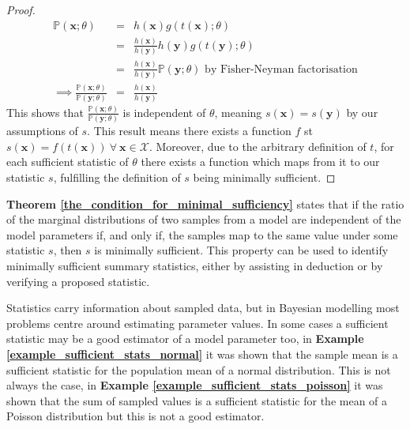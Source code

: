 \documentclass[bibliography=totoc,11pt,a4paper,margin=0]{article}
\newcommand*{\prob}{\mathbb{P}}
\theoremstyle{break}
\begin{document}
\begin{box_theorem}
\begin{proof}
      \[\begin{array}{rcl}
        \prob(\mathbf{x};\theta)&=&h(\mathbf{x})g(t(\mathbf{x});\theta)\\
        &=&\frac{h(\mathbf{x})}{h(\mathbf{y})}h(\mathbf{y})g(t(\mathbf{y});\theta)\\
        &=&\frac{h(\mathbf{x})}{h(\mathbf{y})}\prob(\mathbf{y};\theta)\text{ by Fisher-Neyman factorisation}\\
        \implies\frac{\prob(\mathbf{x};\theta)}{\prob(\mathbf{y};\theta)}&=&\frac{h(\mathbf{x})}{h(\mathbf{y})}
      \end{array}\]
      This shows that $\frac{\prob(\mathbf{x};\theta)}{\prob(\mathbf{y};\theta)}$ is independent of $\theta$, meaning $s(\mathbf{x})=s(\mathbf{y})$ by our assumptions of $s$. This result means there exists a function $f$ st $s(\mathbf{x})=f(t(\mathbf{x}))\ \forall\ \mathbf{x}\in\mathcal{X}$. Moreover, due to the arbitrary definition of $t$, for each sufficient statistic of $\theta$ there exists a function which maps from it to our statistic $s$, fulfilling the definition of $s$ being minimally sufficient.
    \end{proof}
  \end{box_theorem}

  \textbf{Theorem \ref{the_condition_for_minimal_sufficiency}} states that if the ratio of the marginal distributions of two samples from a model are independent of the model parameters if, and only if, the samples map to the same value under some statistic $s$, then $s$ is minimally sufficient. This property can be used to identify minimally sufficient summary statistics, either by assisting in deduction or by verifying a proposed statistic.

  \par Statistics carry information about sampled data, but in Bayesian modelling most problems centre around estimating parameter values. In some cases a sufficient statistic may be a good estimator of a model parameter too, in \textbf{Example \ref{example_sufficient_stats_normal}} it was shown that the sample mean is a sufficient statistic for the population mean of a normal distribution. This is not always the case, in \textbf{Example \ref{example_sufficient_stats_poisson}} it was shown that the sum of sampled values is a sufficient statistic for the mean of a Poisson distribution but this is not a good estimator.
\end{document}
